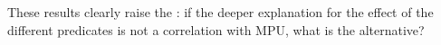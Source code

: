 \documentclass[output=paper]{langsci/langscibook}
\begin{document}
These results clearly raise the : if the deeper explanation for the effect of the different predicates is not a correlation with MPU, what is the alternative?
%
\end{document}
